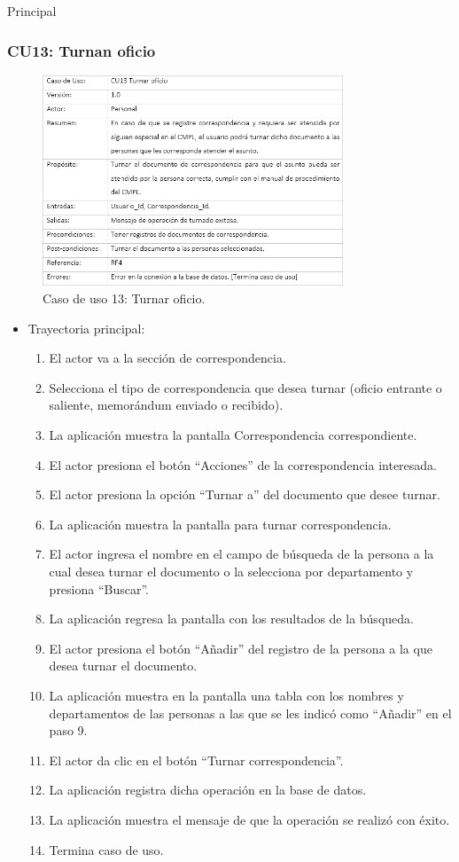 \begin{UCtrayectoria}{Principal}
		\subsubsection{CU13: Turnan oficio}
\begin{figure}[htbp!]
		\centering
			\includegraphics[width=0.8\textwidth]{images/CU/CU13}
		\caption{Caso de uso 13: Turnar oficio.}
		\label{Tabla}
	\end{figure}
	
\begin{itemize}
	\item Trayectoria principal:
	\begin{enumerate}
		\item	El actor va a la sección de correspondencia.
\item	Selecciona el tipo de correspondencia que desea turnar (oficio entrante o saliente, memorándum enviado o recibido).
\item	La aplicación muestra la pantalla  Correspondencia correspondiente.
\item	El actor presiona el botón “Acciones” de la correspondencia interesada.
\item	El actor presiona la opción “Turnar a” del documento que desee turnar.
\item	La aplicación muestra la pantalla  para turnar correspondencia.
\item	El actor ingresa el nombre en el campo de búsqueda de la persona a la cual desea turnar el documento o la selecciona por departamento y presiona “Buscar”.
\item	La aplicación regresa la pantalla con los resultados de la búsqueda.
\item	El actor presiona el botón “Añadir” del registro de la persona a la que desea turnar el documento.
\item	La aplicación muestra en la pantalla una tabla con los nombres y departamentos de las personas a las que se les indicó como “Añadir” en el paso 9.
\item	El actor da clic en el botón “Turnar correspondencia”.
\item	La aplicación registra dicha operación en la base de datos.
\item	La aplicación muestra el mensaje  de que la operación se realizó con éxito.
\item	Termina caso de uso.


\end{enumerate}
\end{itemize}
\end{UCtrayectoria}
